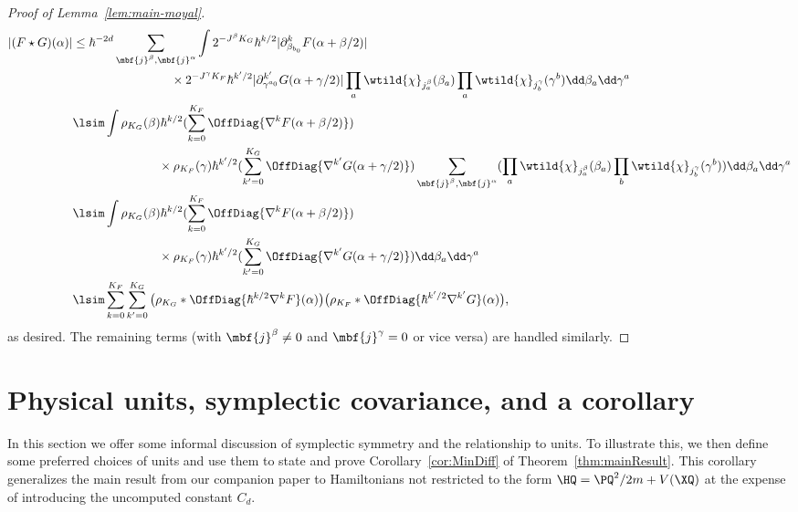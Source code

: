 \documentclass{article}
\numberwithin{equation}{section}
\begin{document}
\begin{proof}[Proof of Lemma~\ref{lem:main-moyal}]
		\begin{equation}
		\begin{split}
			|(F\star G)(\alpha)| 
			&\leq \hbar^{-2d}
			\sum_{\mbf{j}^\beta,\mbf{j}^\alpha}
			\int 2^{-J^\beta K_G}\hbar^{k/2}
			|\partial_{\beta_{b_0}}^k F(\alpha+\beta/2)|\\
			&\qquad\qquad\qquad \qquad 
			\times 2^{-J^\gamma K_F} \hbar^{k'/2}
			|\partial^{k'}_{\gamma^{a_0}}
			G(\alpha+\gamma/2)|
			\prod_a \wtild{\chi}_{j^\beta_a}(\beta_a)
			\prod_a \wtild{\chi}_{j^\gamma_b}(\gamma^b)
			\dd \beta_a \dd\gamma^a\\
			&\lsim
			\int \rho_{K_G}(\beta)\hbar^{k/2}
			(\sum_{k=0}^{K_F}\OffDiag{\nabla^k F(\alpha+\beta/2)})\\
			&\qquad\qquad\qquad \quad 
			\times \rho_{K_F}(\gamma) \hbar^{k'/2}
			(\sum_{k'=0}^{K_G}\OffDiag{\nabla^{k'} G(\alpha+\gamma/2)})
			\sum_{\mbf{j}^\beta,\mbf{j}^\alpha}
			(\prod_a \wtild{\chi}_{j^\beta_a}(\beta_a)
			\prod_b \wtild{\chi}_{j^\gamma_b}(\gamma^b))
			\dd \beta_a \dd\gamma^a\\
			&\lsim
			\int \rho_{K_G}(\beta)\hbar^{k/2}
			(\sum_{k=0}^{K_F}\OffDiag{\nabla^k F(\alpha+\beta/2)})\\
			&\qquad\qquad\qquad \quad
			\times
			\rho_{K_F}(\gamma) \hbar^{k'/2}
			(\sum_{k'=0}^{K_G}\OffDiag{\nabla^{k'} G(\alpha+\gamma/2)})
			\dd \beta_a \dd\gamma^a\\
			&\lsim
			\sum_{k=0}^{K_F} \sum_{k'=0}^{K_G}
			\big(\rho_{K_G} \ast \OffDiag{\hbar^{k/2} \nabla^k F}(\alpha)\big)
			\big(\rho_{K_F} \ast \OffDiag{\hbar^{k'/2} \nabla^{k'} G}(\alpha)\big),
		\end{split}
	\end{equation}
	as desired. The remaining terms
	(with $\mbf{j}^\beta\not=0$ and
	$\mbf{j}^\gamma=0$ or vice versa)
	are handled similarly.
\end{proof}


\appendix

\section{Physical units, symplectic covariance, and a corollary}\label{sec:units-symplectic-covariance}

In this section we offer some informal discussion of symplectic symmetry and the relationship to units.  To illustrate this, we then define some preferred choices of units and use them to state and prove Corollary~\ref{cor:MinDiff} of Theorem~\ref{thm:mainResult}. This corollary generalizes the main result from our companion paper \cite{hernandez2023decoherence1} to Hamiltonians not restricted to the form $\HQ = \PQ^2/2m+V(\XQ)$ at the expense of introducing the uncomputed constant $C_d$.
\end{document}
